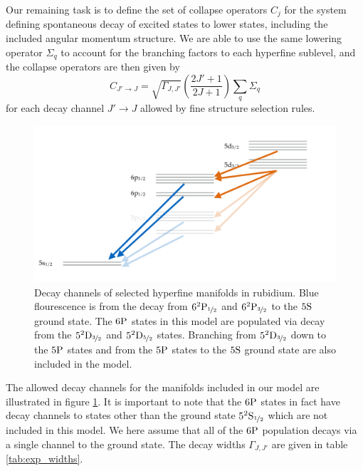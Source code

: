     Our remaining task is to define the set of collapse operators $C_j$ for the
    system defining spontaneous decay of excited states to lower states,
    including the included angular momentum structure. We are able to use the
    same lowering operator $\Sigma_q$ to account for the branching factors to
    each hyperfine sublevel, and the collapse operators are then given by
    \begin{equation}
      C_{J' \rightarrow J} = \sqrt{\Gamma_{J,J'}} 
        \left( \frac{2J' + 1}{2J + 1} \right)  \sum_q \Sigma_q
    \end{equation}
    for each decay channel $J' \rightarrow J$ allowed by fine structure
    selection rules.

    \begin{figure}[]
    \includegraphics[width=\linewidth]
        {figs/05_twophoton/twophoton_level_scheme_decay_2.pdf}
    \caption{
    Decay channels of selected hyperfine manifolds in rubidium.  Blue
    flourescence is from the decay from $6^2\rm{P}_{\nicefrac{1}{2}}$ and
    $6^2\rm{P}_{\nicefrac{3}{2}}$ to the $5\rm{S}$ ground state. The $6\rm{P}$
    states in this model are populated via decay from the
    $5^2\rm{D}_{\nicefrac{3}{2}}$ and $5^2\rm{D}_{\nicefrac{5}{2}}$ states.
    Branching from $5^2\rm{D}_{\nicefrac{3}{2}}$ down to the $5\rm{P}$ states
    and from the $5\rm{P}$ states to the $5\rm{S}$ ground state are also
    included in the model.
    } 
    \label{fig:twophoton_level_scheme_decay} 
    \end{figure}

    The allowed decay channels for the manifolds included in our model are
    illustrated in figure \ref{fig:twophoton_level_scheme_decay}. It is
    important to note that the $6\rm{P}$ states in fact have decay channels to
    states other than the ground state $5^2\rm{S}_{\nicefrac{1}{2}}$ which are
    not included in this model. We here assume that all of the $6\rm{P}$
    population decays via a single channel to the ground state. The decay widths
    $\Gamma_{J,J'}$ are given in table \ref{tab:exp_widths}.
